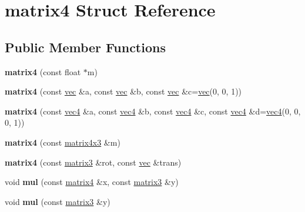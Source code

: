 \hypertarget{structmatrix4}{}\section{matrix4 Struct Reference}
\label{structmatrix4}
\subsection*{Public Member Functions}
\begin{DoxyCompactItemize}
\item 
\mbox{\label{structmatrix4_aac83aa77b21e5413585222618284960b}} 
{\bfseries matrix4} (const float $\ast$m)
\item 
\mbox{\label{structmatrix4_a7fcdea385e1f7fb0c5014c82c4cb3eab}} 
{\bfseries matrix4} (const \hyperlink{structvec}{vec} \&a, const \hyperlink{structvec}{vec} \&b, const \hyperlink{structvec}{vec} \&c=\hyperlink{structvec}{vec}(0, 0, 1))
\item 
\mbox{\label{structmatrix4_a0520da34ee2b7259a8703368ad354706}} 
{\bfseries matrix4} (const \hyperlink{structvec4}{vec4} \&a, const \hyperlink{structvec4}{vec4} \&b, const \hyperlink{structvec4}{vec4} \&c, const \hyperlink{structvec4}{vec4} \&d=\hyperlink{structvec4}{vec4}(0, 0, 0, 1))
\item 
\mbox{\label{structmatrix4_a42400454f0e98c1096f494f8a4e33b54}} 
{\bfseries matrix4} (const \hyperlink{structmatrix4x3}{matrix4x3} \&m)
\item 
\mbox{\label{structmatrix4_abb214a82c05afdfc96703954b212f28b}} 
{\bfseries matrix4} (const \hyperlink{structmatrix3}{matrix3} \&rot, const \hyperlink{structvec}{vec} \&trans)
\item 
\mbox{\label{structmatrix4_ad5a0c75960aa283c6f1ee2cc86119a5f}} 
void {\bfseries mul} (const \hyperlink{structmatrix4}{matrix4} \&x, const \hyperlink{structmatrix3}{matrix3} \&y)
\item 
\mbox{\label{structmatrix4_afd601cafab64fcbdac5ef3dbb4147fa0}} 
void {\bfseries mul} (const \hyperlink{structmatrix3}{matrix3} \&y)
\item 
\mbox{\label{structmatrix4_ad863697403586b33bcd1fcb60158b77a}} 

\end{DoxyCompactItemize}
